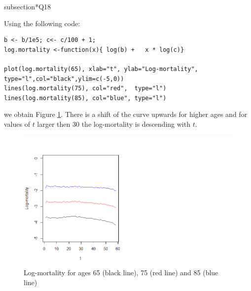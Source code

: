 \documentclass[11pt]{article}
\begin{document}
subsection*{Q18}

Using the following code:
\begin{verbatim}
b <- b/1e5; c<- c/100 + 1;
log.mortality <-function(x){ log(b) + 	x * log(c)}

plot(log.mortality(65), xlab="t", ylab="Log-mortality", type="l",col="black",ylim=c(-5,0))
lines(log.mortality(75), col="red",  type="l")
lines(log.mortality(85), col="blue", type="l")
\end{verbatim}

we obtain Figure \ref{Figure_Question18}. There is a shift of the curve upwards for higher ages and for values of $t$ larger then 30 the log-mortality is descending with $t$.

\begin{center}
	\begin{figure}[H]
		
		\includegraphics[scale=0.60]{NL3_Question18.png}
		
		\caption{Log-mortality for ages 65 (black line), 75 (red line) and 85 (blue line)}
		\label{Figure_Question18}
		
	\end{figure}
\end{center}
\end{document}
